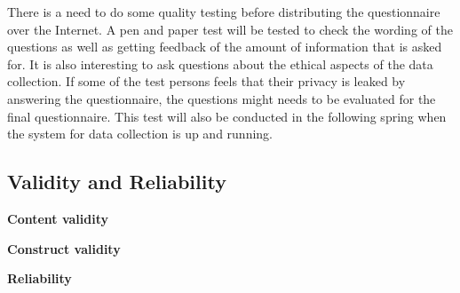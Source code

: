     There is a need to do some quality testing before distributing the questionnaire over the Internet. A pen and paper test will be tested to check the wording of the questions as well as getting feedback of the amount of information that is asked for. It is also interesting to ask questions about the ethical aspects of the data collection. If some of the test persons feels that their privacy is leaked by answering the questionnaire, the questions might needs to be evaluated for the final questionnaire. 
    This test will also be conducted in the following spring when the system for data collection is up and running. 

  \subsection{Validity and Reliability}\label{sec:validityandreliability}

    {\bf Content validity}

    {\bf Construct validity}

    {\bf Reliability}